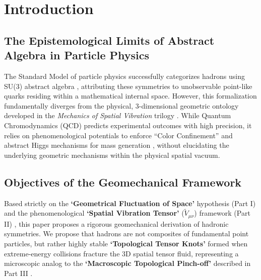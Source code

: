 \documentclass[reprint,amsmath,amssymb,aps,prd]{revtex4-2}
\begin{document}
\begin{abstract}
Finally, we formalize the arbitrary quantum number of ``Strangeness'' as the torsional winding tension ($\mathcal{W}$) of the topological knot. Strong interaction conservation is derived via Kelvin's circulation theorem for an ideal fluid, whereas weak interaction decay is mathematically modeled as topological decoherence (unknotting). This unwinding process is strictly governed by the same real-valued, non-linear \textbf{`spatial geometric viscosity'} ($+\gamma(S - \langle S \rangle)$) that drives \textbf{`Phase Turbulence'} (Part I). By bridging abstract group theory with deterministic spatial geomechanics, this study offers a complete mathematical realization of a \textbf{`Periodic Table of Space,'} seamlessly unifying the microscopic particle zoo with continuous spatial tensor dynamics under the universal principle of \textbf{`Fractal Scale Symmetry'} (Part III).
\end{abstract}

\maketitle

\section{Introduction}

\subsection{The Epistemological Limits of Abstract Algebra in Particle Physics}
The Standard Model of particle physics successfully categorizes hadrons using SU(3) abstract algebra \cite{GellMann1964}, attributing these symmetries to unobservable point-like quarks residing within a mathematical internal space. However, this formalization fundamentally diverges from the physical, 3-dimensional geometric ontology developed in the \textit{Mechanics of Spatial Vibration} trilogy \cite{YooPart1, YooPart2, YooPart3}. While Quantum Chromodynamics (QCD) predicts experimental outcomes with high precision, it relies on phenomenological potentials to enforce ``Color Confinement'' \cite{Wilson1974} and abstract Higgs mechanisms for mass generation \cite{Higgs1964}, without elucidating the underlying geometric mechanisms within the physical spatial vacuum.

\subsection{Objectives of the Geomechanical Framework}
Based strictly on the \textbf{`Geometrical Fluctuation of Space'} hypothesis (Part I) \cite{YooPart1} and the phenomenological \textbf{`Spatial Vibration Tensor'} ($\tilde{V}_{\mu\nu}$) framework (Part II) \cite{YooPart2}, this paper proposes a rigorous geomechanical derivation of hadronic symmetries. We propose that hadrons are not composites of fundamental point particles, but rather highly stable \textbf{`Topological Tensor Knots'} formed when extreme-energy collisions fracture the 3D spatial tensor fluid, representing a microscopic analog to the \textbf{`Macroscopic Topological Pinch-off'} described in Part III \cite{YooPart3}. 
\end{document}
